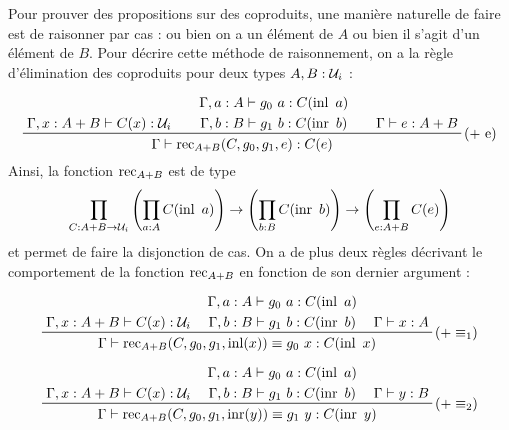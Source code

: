 \documentclass[../../rapport.tex]{subfiles}
\begin{document}
  Pour prouver des propositions sur des coproduits, une manière naturelle de faire est de raisonner par cas :
  ou bien on a un élément de $A$ ou bien il s'agit d'un élément de $B$.
  Pour décrire cette méthode de raisonnement, on a la règle d'élimination des coproduits pour deux types $A, B : \mathcal U_i$ :

  $$
  \prfinterspace=2em
  \prftree[r]{($+$ e)}
    {\Gamma, x : A+B \vdash C(x) : \U_i}
    {\prfStackPremises
      {\Gamma, a : A \vdash g_0\ a : C(\inl\ a)}
      {\Gamma, b : B \vdash g_1\ b : C(\inr\ b)}}
    {\Gamma \vdash e : A + B}
  {\Gamma \vdash \rec_{A+B}(C, g_0, g_1, e) : C(e)}
  $$
  Ainsi, la fonction $\operatorname{rec}_{A+B}$ est de type %
  $$\prod_{C : A+B \rightarrow \mathcal U_i}\left(\prod_{a : A}C(\operatorname{inl}\ a)\right) \rightarrow \left(\prod_{b : B}C(\operatorname{inr}\ b)\right) \rightarrow \left(\prod_{e:A+B}C(e)\right)$$
  et permet de faire la disjonction de cas.
  On a de plus deux règles décrivant le comportement de la fonction $\operatorname{rec}_{A+B}$ en fonction de son dernier argument :

  $$
  \prfinterspace=1.2em
  \prftree[r]{($+ \equiv_1$)}
    {\Gamma, x : A+B \vdash C(x) : \U_i}
    {\prfStackPremises
      {\Gamma, a : A \vdash g_0\ a : C(\inl\ a)}
      {\Gamma, b : B \vdash g_1\ b : C(\inr\ b)}}
    {\Gamma \vdash x : A}
  {\Gamma \vdash \rec_{A+B}(C, g_0, g_1, \inl(x)) \equiv g_0\ x : C(\inl\ x)}
  $$

  $$
  \prfinterspace=1.2em
  \prftree[r]{($+ \equiv_2$)}
    {\Gamma, x : A+B \vdash C(x) : \U_i}
    {\prfStackPremises
      {\Gamma, a : A \vdash g_0\ a : C(\inl\ a)}
      {\Gamma, b : B \vdash g_1\ b : C(\inr\ b)}}
    {\Gamma \vdash y : B}
  {\Gamma \vdash \rec_{A+B}(C, g_0, g_1, \inr(y)) \equiv g_1\ y : C(\inr\ y)}
  $$
\end{document}
